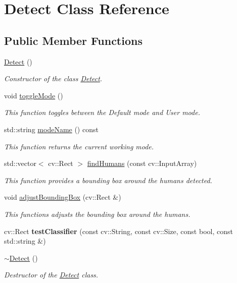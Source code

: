 \hypertarget{classDetect}{}\section{Detect Class Reference}
\label{classDetect}
\subsection*{Public Member Functions}
\begin{DoxyCompactItemize}
\item 
\hyperlink{classDetect_afefa427dddf8e308f93fd49424cc3680}{Detect} ()
\begin{DoxyCompactList}\small\item\em Constructor of the class \hyperlink{classDetect}{Detect}. \end{DoxyCompactList}\item 
void \hyperlink{classDetect_a75d4c27eb616460a8ba5a387620626e6}{toggle\+Mode} ()\hypertarget{classDetect_a75d4c27eb616460a8ba5a387620626e6}{}\label{classDetect_a75d4c27eb616460a8ba5a387620626e6}

\begin{DoxyCompactList}\small\item\em This function toggles between the Default mode and User mode. \end{DoxyCompactList}\item 
std\+::string \hyperlink{classDetect_a0742e945747fa012fb22d957a459978c}{mode\+Name} () const 
\begin{DoxyCompactList}\small\item\em This function returns the current working mode. \end{DoxyCompactList}\item 
std\+::vector$<$ cv\+::\+Rect $>$ \hyperlink{classDetect_a1d25bc00785e30f42c1f6211d11786d0}{find\+Humans} (const cv\+::\+Input\+Array)
\begin{DoxyCompactList}\small\item\em This function provides a bounding box around the humans detected. \end{DoxyCompactList}\item 
void \hyperlink{classDetect_a9b8ebb6ab8c9a07febbba30c03f55fce}{adjust\+Bounding\+Box} (cv\+::\+Rect \&)
\begin{DoxyCompactList}\small\item\em This functions adjusts the bounding box around the humans. \end{DoxyCompactList}\item 
cv\+::\+Rect {\bfseries test\+Classifier} (const cv\+::\+String, const cv\+::\+Size, const bool, const std\+::string \&)\hypertarget{classDetect_aa04e736f215a89c0cd164e0465bf9f44}{}\label{classDetect_aa04e736f215a89c0cd164e0465bf9f44}

\item 
\hyperlink{classDetect_aa808b1146b9b8db316b25b02f0a6b5f3}{$\sim$\+Detect} ()
\begin{DoxyCompactList}\small\item\em Destructor of the \hyperlink{classDetect}{Detect} class. \end{DoxyCompactList}\end{DoxyCompactItemize}
